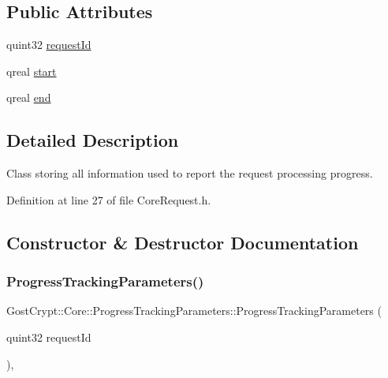 \subsection*{Public Attributes}
\begin{DoxyCompactItemize}
\item 
quint32 \hyperlink{struct_gost_crypt_1_1_core_1_1_progress_tracking_parameters_a4359b9c9116512f80f119936da069a80}{request\+Id}
\item 
qreal \hyperlink{struct_gost_crypt_1_1_core_1_1_progress_tracking_parameters_a4b1108100f824c96553d57697c2739b4}{start}
\item 
qreal \hyperlink{struct_gost_crypt_1_1_core_1_1_progress_tracking_parameters_aa2da7bedf0c93464cc41f268c3977a5d}{end}
\end{DoxyCompactItemize}


\subsection{Detailed Description}
Class storing all information used to report the request processing progress. 

Definition at line 27 of file Core\+Request.\+h.



\subsection{Constructor \& Destructor Documentation}
\mbox{\label{struct_gost_crypt_1_1_core_1_1_progress_tracking_parameters_a92eed387fce314d533b9c7ddeda53d49}} 
\subsubsection{\texorpdfstring{Progress\+Tracking\+Parameters()}{ProgressTrackingParameters()}\hspace{0.1cm}{\footnotesize\ttfamily [1/3]}}
{\footnotesize\ttfamily Gost\+Crypt\+::\+Core\+::\+Progress\+Tracking\+Parameters\+::\+Progress\+Tracking\+Parameters (\begin{DoxyParamCaption}\item[{quint32}]{request\+Id }\end{DoxyParamCaption})\hspace{0.3cm}{\ttfamily [inline]}, {\ttfamily [explicit]}}



